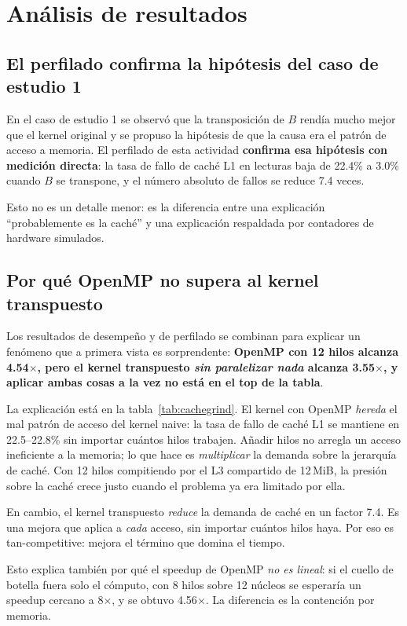 \section{Análisis de resultados}

\subsection{El perfilado confirma la hipótesis del caso de estudio 1}

En el caso de estudio 1 se observó que la transposición de $B$ rendía mucho mejor que el kernel original y se propuso la hipótesis de que la causa era el patrón de acceso a memoria. El perfilado de esta actividad \textbf{confirma esa hipótesis con medición directa}: la tasa de fallo de caché L1 en lecturas baja de 22.4\% a 3.0\% cuando $B$ se transpone, y el número absoluto de fallos se reduce 7.4 veces.

Esto no es un detalle menor: es la diferencia entre una explicación ``probablemente es la caché'' y una explicación respaldada por contadores de hardware simulados.

\subsection{Por qué OpenMP no supera al kernel transpuesto}

Los resultados de desempeño y de perfilado se combinan para explicar un fenómeno que a primera vista es sorprendente: \textbf{OpenMP con 12 hilos alcanza 4.54$\times$, pero el kernel transpuesto \emph{sin paralelizar nada} alcanza 3.55$\times$, y aplicar ambas cosas a la vez no está en el top de la tabla}.

La explicación está en la tabla~\ref{tab:cachegrind}. El kernel con OpenMP \emph{hereda} el mal patrón de acceso del kernel naive: la tasa de fallo de caché L1 se mantiene en 22.5--22.8\% sin importar cuántos hilos trabajen. Añadir hilos no arregla un acceso ineficiente a la memoria; lo que hace es \emph{multiplicar} la demanda sobre la jerarquía de caché. Con 12 hilos compitiendo por el L3 compartido de 12\,MiB, la presión sobre la caché crece justo cuando el problema ya era limitado por ella.

En cambio, el kernel transpuesto \emph{reduce} la demanda de caché en un factor 7.4. Es una mejora que aplica a \emph{cada} acceso, sin importar cuántos hilos haya. Por eso es tan-competitive: mejora el término que domina el tiempo.

Esto explica también por qué el speedup de OpenMP \emph{no es lineal}: si el cuello de botella fuera solo el cómputo, con 8 hilos sobre 12 núcleos se esperaría un speedup cercano a 8$\times$, y se obtuvo 4.56$\times$. La diferencia es la contención por memoria.

